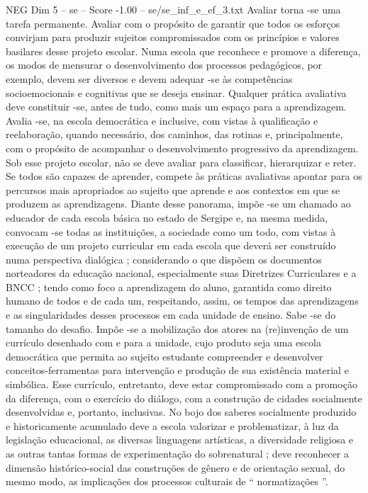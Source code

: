 \begin{textsample}{NEG Dim 5 – se – Score -1.00 – se/se\_inf\_e\_ef\_3.txt}
Avaliar torna -se uma tarefa permanente.
Avaliar com o propósito de garantir que todos os esforços convirjam para produzir sujeitos compromissados com os princípios e valores basilares desse projeto escolar.
Numa escola que reconhece e promove a diferença, os modos de mensurar o desenvolvimento dos processos pedagógicos, por exemplo, devem ser diversos e devem adequar -se às competências socioemocionais e cognitivas que se deseja ensinar.
Qualquer prática avaliativa deve constituir -se, antes de tudo, como mais um espaço para a aprendizagem.
Avalia -se, na escola democrática e inclusive, com vistas à qualificação e reelaboração, quando necessário, dos caminhos, das rotinas e, principalmente, com o propósito de acompanhar o desenvolvimento progressivo da aprendizagem.
Sob esse projeto escolar, não se deve avaliar para classificar, hierarquizar e reter.
Se todos são capazes de aprender, compete às práticas avaliativas apontar para os percursos mais apropriados ao sujeito que aprende e aos contextos em que se produzem as aprendizagens.
Diante desse panorama, impõe -se um chamado ao educador de cada escola básica no estado de Sergipe e, na mesma medida, convocam -se todas as instituições, a sociedade como um todo, com vistas à execução de um projeto curricular em cada escola que deverá ser construído numa perspectiva dialógica ; considerando o que dispõem os documentos norteadores da educação nacional, especialmente suas Diretrizes Curriculares e a BNCC ; tendo como foco a aprendizagem do aluno, garantida como direito humano de todos e de cada um, respeitando, assim, os tempos das aprendizagens e as singularidades desses processos em cada unidade de ensino.
Sabe -se do tamanho do desafio.
Impõe -se a mobilização dos atores na (re)invenção de um currículo desenhado com e para a unidade, cujo produto seja uma escola democrática que permita ao sujeito estudante compreender e desenvolver conceitos-ferramentas para intervenção e produção de sua existência material e simbólica.
Esse currículo, entretanto, deve estar compromissado com a promoção da diferença, com o exercício do diálogo, com a construção de cidades socialmente desenvolvidas e, portanto, inclusivas.
No bojo dos saberes socialmente produzido e historicamente acumulado deve a escola valorizar e problematizar, à luz da legislação educacional, as diversas linguagens artísticas, a diversidade religiosa e as outras tantas formas de experimentação do sobrenatural ; deve reconhecer a dimensão histórico-social das construções de gênero e de orientação sexual, do mesmo modo, as implicações dos processos culturais de “ normatizações ”.

\end{textsample}
